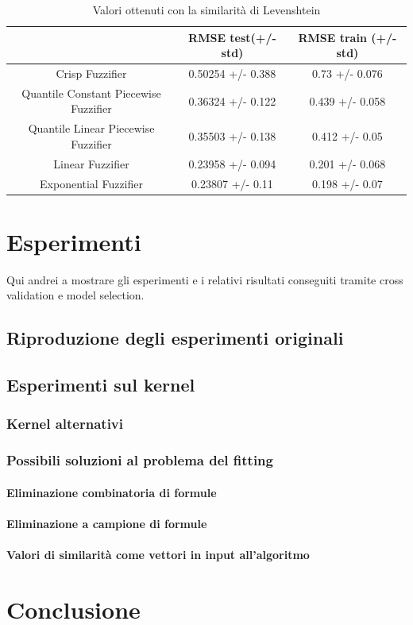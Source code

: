 \documentclass[12pt,a4paper]{report}
\begin{document}
\begin{table}[h!]
\small
\centering 	
	\begin{tabular}{|c|c|c|} 
	 \hline
	  & RMSE test(+/- std) & RMSE train (+/- std)\\ [0.5ex] 
	 \hline
	 Crisp Fuzzifier & 0.50254 +/- 0.388 & 0.73 +/- 0.076 \\ 
	 \hline
	 Quantile Constant Piecewise Fuzzifier & 0.36324 +/- 0.122 & 0.439 +/- 0.058\\
	 \hline
	 Quantile Linear Piecewise Fuzzifier & 0.35503 +/- 0.138	 & 0.412 +/- 0.05\\
	 \hline
	 Linear Fuzzifier & 0.23958 +/- 0.094 & 0.201 +/- 0.068\\
	 \hline
	 Exponential Fuzzifier & 0.23807 +/- 0.11 & 0.198 +/- 0.07\\ [1ex] 
	 \hline
	\end{tabular}
	\caption{Valori ottenuti con la similarità di Levenshtein}
	\label{table:risultatiLevenshtein}
\end{table}


\chapter{Esperimenti}\label{capitoloEsperimenti}
Qui andrei a mostrare gli esperimenti e i relativi risultati conseguiti tramite cross validation e model selection.
\section{Riproduzione degli esperimenti originali}
\section{Esperimenti sul kernel}
\subsection{Kernel alternativi}
\subsection{Possibili soluzioni al problema del fitting}
\subsubsection{Eliminazione combinatoria di formule}
\subsubsection{Eliminazione a campione di formule}
\subsubsection{Valori di similarità come vettori in input all'algoritmo}

\chapter*{Conclusione}



\end{document}
